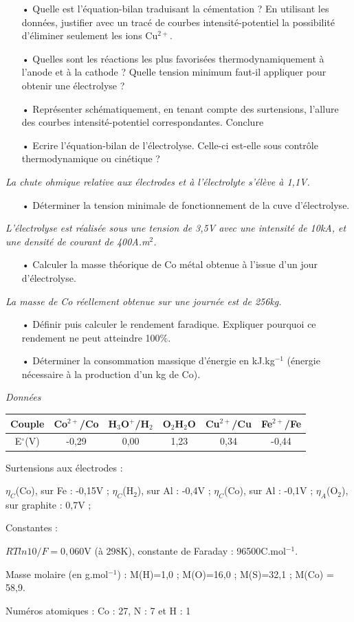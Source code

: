 \documentclass{report}
\begin{document}
\begin{itemize}
	\item[•] Quelle est l'équation-bilan traduisant la cémentation ? En utilisant les données, justifier avec un tracé de courbes intensité-potentiel la possibilité d'éliminer seulement les ions Cu$^{2+}$. 
	\item[•] Quelles sont les réactions les plus favorisées thermodynamiquement à l'anode et à la cathode ? Quelle tension minimum faut-il appliquer pour obtenir une électrolyse ? 
	\item[•] Représenter schématiquement, en tenant compte des surtensions, l'allure des courbes intensité-potentiel correspondantes. Conclure
	\item[•] Ecrire l'équation-bilan de l'électrolyse. Celle-ci est-elle sous contrôle thermodynamique ou cinétique ?
\end{itemize}
\textit{La chute ohmique relative aux électrodes et à l'électrolyte s'élève à 1,1V.}
\begin{itemize}
	\item[•] Déterminer la tension minimale de fonctionnement de la cuve d'électrolyse. 
\end{itemize}
\textit{L'électrolyse est réalisée sous une tension de 3,5V avec une intensité de 10kA, et une densité de courant de 400A.m$^2$.}
\begin{itemize}
	\item[•] Calculer la masse théorique de Co métal obtenue à l'issue d'un jour d'électrolyse. 
\end{itemize}
\textit{La masse de Co réellement obtenue sur une journée est de 256kg.}
\begin{itemize}
	\item[•] Définir puis calculer le rendement faradique. Expliquer pourquoi ce rendement ne peut atteindre 100$\%$.
	\item[•] Déterminer la consommation massique d'énergie en kJ.kg$^{-1}$ (énergie nécessaire à la production d'un kg de Co).
\end{itemize}

\textit{Données}

\vspace{0,2cm}
\begin{tabular}{|c|c|c|c|c|c|}
\hline
Couple & Co$^{2+}$/Co &  H$_3$O$^{+}$/H$_2$ & O$_2$H$_2$O & Cu$^{2+}$/Cu & Fe$^{2+}$/Fe\\
\hline
E$^\circ$(V) & -0,29 & 0,00 & 1,23 & 0,34 & -0,44\\
\hline
\end{tabular}

Surtensions aux électrodes : 

$\eta_C$(Co), sur Fe : -0,15V ;
$\eta_C$(H$_2$), sur Al : -0,4V ;
$\eta_C$(Co), sur Al : -0,1V ;
$\eta_A$(O$_2$), sur graphite : 0,7V ;

Constantes : 

$RTln10/F=0,060$V (à 298K), constante de Faraday : 96500C.mol$^{-1}$.

Masse molaire (en g.mol$^{-1}$) : M(H)=1,0 ; M(O)=16,0 ; M(S)=32,1 ; M(Co) = 58,9. 

Numéros atomiques : Co : 27, N : 7 et H : 1
\end{document}
